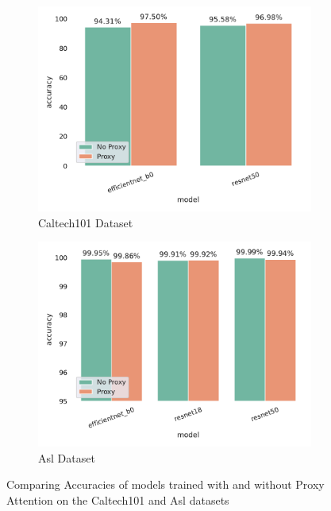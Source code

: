 \documentclass[a4paper,11pt,openright]{book}
\begin{document}
\begin{figure}[!htb]
    \begin{subfigure}[h]{.5\textwidth}
        \includegraphics[width=\linewidth, right]{results/caltech101_results.pdf}
        \caption{Caltech101 Dataset}
    \end{subfigure}
    \begin{subfigure}[h]{.5\textwidth}
        \includegraphics[width=\linewidth, left]{results/asl_results.pdf}
        \caption{Asl Dataset}
    \end{subfigure}
    \caption{Comparing Accuracies of models trained with and without Proxy Attention on the Caltech101 and Asl datasets}
    \label{fig:caltech101_asl_results}
\end{figure}
\end{document}
